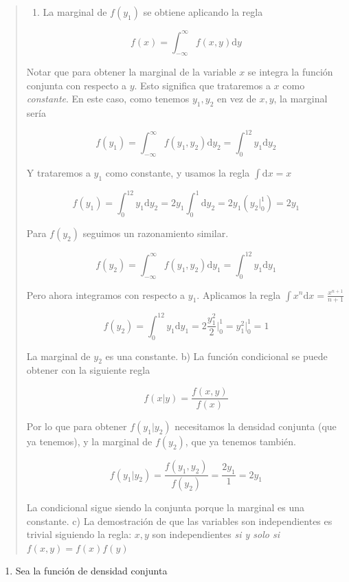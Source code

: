 \documentclass[
  letterpaper,
  DIV=11,
  numbers=noendperiod]{scrartcl}
\providecommand{\tightlist}{%
  \setlength{\itemsep}{0pt}\setlength{\parskip}{0pt}}\usepackage{longtable,booktabs,array}
\begin{document}
\begin{quote}
\begin{enumerate}
\def\labelenumi{\alph{enumi})}
\tightlist
\item
  La marginal de \(f(y_1)\) se obtiene aplicando la regla
\end{enumerate}

\[
 f(x) = \int_{-\infty}^\infty f(x, y)\text{d}y
\]

Notar que para obtener la marginal de la variable \(x\) se integra la
función conjunta con respecto a \(y\). Esto significa que trataremos a
\(x\) como \emph{constante}. En este caso, como tenemos \(y_1, y_2\) en
vez de \(x, y\), la marginal sería

\[
 f(y_1)= \int_{-\infty}^\infty f(y_1, y_2)\text{d}y_2=\int_{0}^12y_1\text{d}y_2
\]

Y trataremos a \(y_1\) como constante, y usamos la regla
\(\int \text{d}x=x\)

\[
 f(y_1)=\int_{0}^12y_1\text{d}y_2=2y_1\int_{0}^1\text{d}y_2=2y_1\left(y_2\Big|_0^1\right)=2y_1
\]

Para \(f(y_2)\) seguimos un razonamiento similar.

\[
 f(y_2)= \int_{-\infty}^\infty f(y_1, y_2)\text{d}y_1=\int_{0}^12y_1\text{d}y_1
\]

Pero ahora integramos con respecto a \(y_1\). Aplicamos la regla
\(\int x^n \text{d}x=\frac{x^{n+1}}{n+1}\)

\[
 f(y_2)=\int_{0}^12y_1\text{d}y_1=2\frac{y_1^2}{2}\Big|_0^1=y_1^2\Big|_0^1=1
\]

La marginal de \(y_2\) es una constante. b) La función condicional se
puede obtener con la siguiente regla

\[
 f(x|y) = \frac{f(x, y)}{f(x)}
\]

Por lo que para obtener \(f(y_1|y_2)\) necesitamos la densidad conjunta
(que ya tenemos), y la marginal de \(f(y_2)\), que ya tenemos también.

\[
 f(y_1|y_2) = \frac{f(y_1, y_2)}{f(y_2)} = \frac{2y_1}{1}=2y_1
\]

La condicional sigue siendo la conjunta porque la marginal es una
constante. c) La demostración de que las variables son independientes es
trivial siguiendo la regla: \(x,y\) son independientes \emph{si y solo
si} \(f(x,y)=f(x)f(y)\)
\end{quote}

\begin{enumerate}
\def\labelenumi{\arabic{enumi}.}
\setcounter{enumi}{6}
\tightlist
\item
  Sea la función de densidad conjunta
\end{enumerate}
\end{document}
